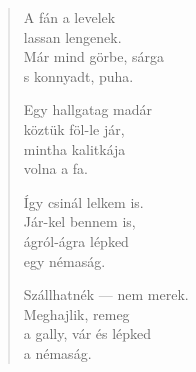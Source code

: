 \documentclass[11pt]{extbook}
\newcommand*{\centeredornament}{\centerline{\pgfornament[width=6cm]{88}}}
\begin{document}
\newpage

\vspace*{-15mm}
\centeredornament



\begin{verse}
  A fán a levelek \\
  lassan lengenek. \\
  Már mind görbe, sárga \\
  s konnyadt, puha.

  Egy hallgatag madár \\
  köztük föl-le jár, \\
  mintha kalitkája \\
  volna a fa.

  Így csinál lelkem is. \\
  Jár-kel bennem is, \\
  ágról-ágra lépked \\
  egy némaság.

  Szállhatnék --- nem merek. \\
  Meghajlik, remeg \\
  a gally, vár és lépked \\
  a némaság.
\end{verse}

\newpage


\vspace*{-15mm}
\centeredornament


\end{document}
